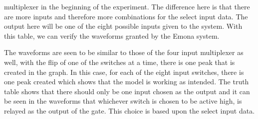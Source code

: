 \documentclass[12pt]{article}
\begin{document}
multiplexer in the beginning of the experiment. The difference here is that
there are more inputs and therefore more combinations for the select input data.
The output here will be one of the eight possible inputs given to the system.
With this table, we can verify the waveforms granted by the Emona system.
\par The waveforms are seen to be similar to those of the four input multiplexer
as well, with the flip of one of the switches at a time, there is one peak that
is created in the graph. In this case, for each of the eight input switches,
there is one peak created which shows that the model is working as intended. The
truth table shows that there should only be one input chosen as the output and
it can be seen in the waveforms that whichever switch is chosen to be active
high, is relayed as the output of the gate. This choice is based upon the select
input data.
\end{document}

